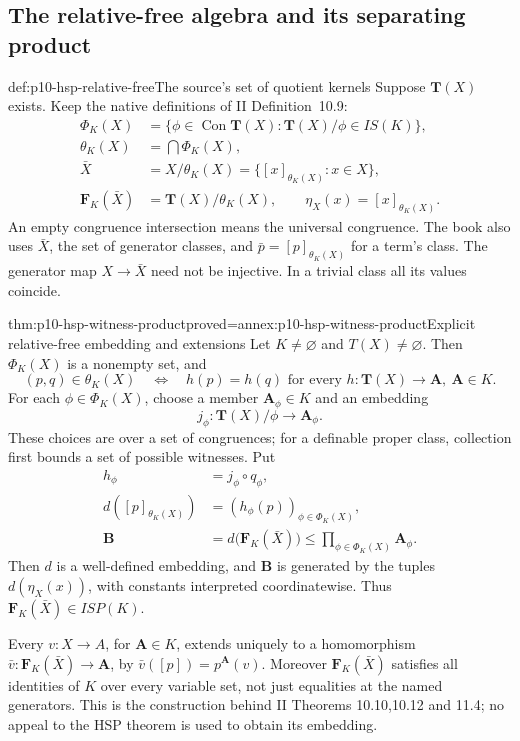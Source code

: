 \subsection{The relative-free algebra and its separating product}
\label{sec:p10-hsp-kernel-construction}

\begin{hbdefinition}{def:p10-hsp-relative-free}{The source's set of quotient kernels}
Suppose \(\mathbf T(X)\) exists. Keep the native definitions
of II Definition~10.9:
\[
 \begin{split}
 \Phi_K(X)&=\{\phi\in\operatorname{Con}\mathbf T(X):
               \mathbf T(X)/\phi\in IS(K)\},\\
 \theta_K(X)&=\bigcap\Phi_K(X),\\
 \bar X&=X/\theta_K(X)=\{[x]_{\theta_K(X)}:x\in X\},\\
 \mathbf F_K(\bar X)&=\mathbf T(X)/\theta_K(X),\qquad
 \eta_X(x)=[x]_{\theta_K(X)}.
 \end{split}
 \tag{HSP.3}
\]
An empty congruence intersection means the universal congruence.
The book also uses \(\bar X\), the set of generator classes,
and \(\bar p=[p]_{\theta_K(X)}\) for a term's class.
The generator map \(X\to\bar X\) need not be injective.
In a trivial class all its values coincide.
\end{hbdefinition}

\begin{hbtheorem}{thm:p10-hsp-witness-product}{proved=annex:p10-hsp-witness-product}{Explicit relative-free embedding and extensions}
Let \(K\ne\varnothing\) and \(T(X)\ne\varnothing\).
Then \(\Phi_K(X)\) is a nonempty set, and
\[
 (p,q)\in\theta_K(X)
 \quad\Longleftrightarrow\quad
 h(p)=h(q)\text{ for every }h:\mathbf T(X)\to\mathbf A,\
                                             \mathbf A\in K.
 \tag{HSP.4}
\]
For each \(\phi\in\Phi_K(X)\), choose a member
\(\mathbf A_\phi\in K\) and an embedding
\[
 j_\phi:\mathbf T(X)/\phi\longrightarrow\mathbf A_\phi.
 \]
These choices are over a set of congruences; for a definable
proper class, collection first bounds a set of possible witnesses.
Put
\[
 \begin{split}
 h_\phi&=j_\phi\circ q_\phi,\\
 d([p]_{\theta_K(X)})&=(h_\phi(p))_{\phi\in\Phi_K(X)},\\
 \mathbf B&=
   d\bigl(\mathbf F_K(\bar X)\bigr)
      \leq\prod_{\phi\in\Phi_K(X)}\mathbf A_\phi.
 \end{split}
 \tag{HSP.5}
\]
Then \(d\) is a well-defined embedding, and \(\mathbf B\)
is generated by the tuples \(d(\eta_X(x))\), with constants
interpreted coordinatewise. Thus \(\mathbf F_K(\bar X)\in ISP(K)\).

Every \(v:X\to A\), for \(\mathbf A\in K\), extends
uniquely to a homomorphism
\(\bar v:\mathbf F_K(\bar X)\to\mathbf A\), by
\(\bar v([p])=p^{\mathbf A}(v)\).
Moreover \(\mathbf F_K(\bar X)\) satisfies all identities of \(K\)
over every variable set, not just equalities at the named generators.
This is the construction behind II Theorems 10.10,10.12 and 11.4;
no appeal to the HSP theorem is used to obtain its embedding.
\end{hbtheorem}

